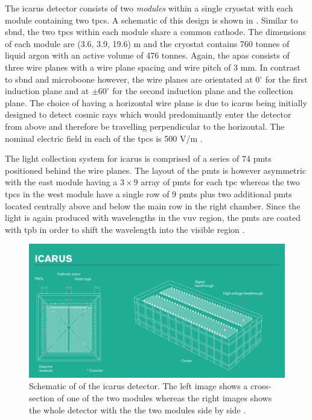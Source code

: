 The \gls{icarus} detector consists of two \textit{modules} within a single cryostat with each module containing two \glspl{tpc}. A schematic of this design is shown in . Similar to \gls{sbnd}, the two \glspl{tpc} within each module share a common cathode. The dimensions of each module are (3.6, 3.9, 19.6) m and the cryostat contains 760 tonnes of liquid argon with an active volume of 476 tonnes.  Again, the \glspl{apa} consists of three wire planes with a wire plane spacing and wire pitch of 3 mm. In contrast to \gls{sbnd} and \gls{microboone} however, the wire planes are orientated at 0$^\circ$ for the first induction plane and at $\pm 60^\circ$ for the second induction plane and the collection plane. The choice of having a horizontal wire plane is due to \gls{icarus} being initially designed to detect cosmic rays which would predominantly enter the detector from above and therefore be travelling perpendicular to the horizontal. The nominal electric field in each of the \glspl{tpc} is 500 V/m \cite{SBN_Proposal}. 

The light collection system for \gls{icarus} is comprised of a series of 74 \glspl{pmt} positioned behind the wire planes. The layout of the \glspl{pmt} is however asymmetric with the east module having a $3 \times 9$ array of \glspl{pmt} for each \gls{tpc} whereas the two \glspl{tpc} in the west module have a single row of 9 \glspl{pmt} plus two additional \glspl{pmt} located centrally above and below the main row in the right chamber. Since the light is again produced with wavelengths in the \gls{vuv} region, the \glspl{pmt} are coated with \gls{tpb} in order to shift the wavelength into the visible region \cite{SBN_Proposal}.  

\begin{figure}[h!]
    \centering
    \includegraphics[width = \largefigwidth]{figures-chap3/icarus.png}
    \caption[ICARUS detector.]{Schematic of of the \gls{icarus} detector. The left image shows a cross-section of one of the two modules whereas the right images shows the whole detector with the the two modules side by side \cite{ICARUS_image}.}
    \label{fig:icarus}
\end{figure}

